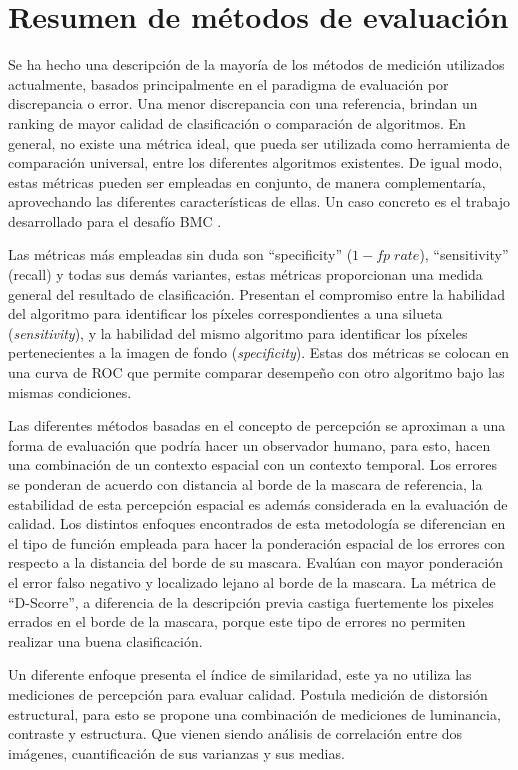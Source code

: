 \section{Resumen de métodos de evaluación}
Se ha hecho una descripción de la mayoría de los métodos de medición utilizados actualmente, basados principalmente en el paradigma de evaluación por discrepancia  o error. Una menor discrepancia con una referencia, brindan un ranking de mayor calidad de clasificación o comparación de algoritmos. En general, no existe una métrica ideal, que pueda ser utilizada como herramienta de comparación universal, entre los diferentes algoritmos existentes. De igual modo, estas métricas pueden ser empleadas en conjunto, de manera complementaría, aprovechando las diferentes características de ellas. Un caso concreto es el trabajo desarrollado para el desafío BMC \cite{park_benchmark_2013}.

Las métricas más empleadas sin duda son ``specificity'' ($1-fp\; rate$), ``sensitivity'' (recall) y todas sus demás variantes, estas métricas proporcionan una medida general del resultado de clasificación. Presentan el compromiso entre la habilidad del algoritmo para identificar los píxeles correspondientes a una silueta (\emph{sensitivity}), y la habilidad del mismo algoritmo para identificar los píxeles pertenecientes a la imagen de fondo (\emph{specificity}). Estas dos métricas se colocan en una curva de ROC que permite comparar desempeño con otro algoritmo bajo las mismas condiciones. 

Las diferentes métodos basadas en el concepto de percepción se aproximan a una forma de evaluación que podría hacer un observador humano, para esto, hacen una combinación de un contexto espacial con un contexto temporal. Los errores se ponderan de acuerdo con distancia al borde de la mascara de referencia, la estabilidad de esta percepción espacial es además considerada en la evaluación de calidad. Los distintos enfoques encontrados de esta metodología se diferencian en el tipo de función empleada para hacer la ponderación espacial de los errores con respecto a la distancia del borde de su mascara. Evalúan con mayor ponderación el error falso negativo y localizado lejano al borde de la mascara. La métrica de ``D-Scorre'', a diferencia de la descripción previa castiga fuertemente los pixeles errados en el borde de la mascara, porque este tipo de errores no permiten realizar una buena clasificación.

Un diferente enfoque presenta el índice de similaridad, este ya no utiliza las mediciones de percepción para evaluar calidad. Postula medición de distorsión estructural, para esto se propone una combinación de mediciones de luminancia, contraste y estructura. Que vienen siendo análisis de correlación entre dos imágenes, cuantificación de sus varianzas y sus medias. 

